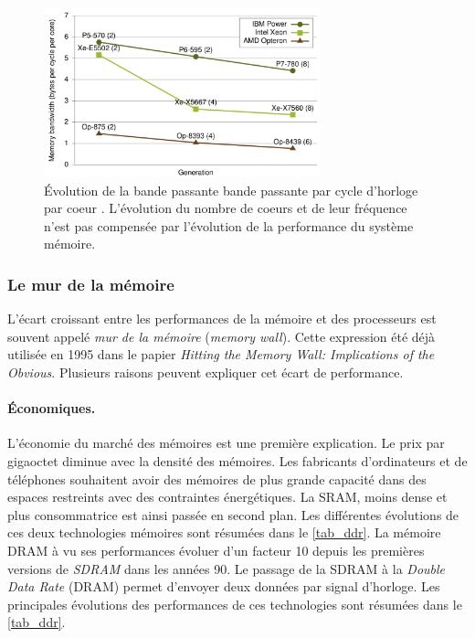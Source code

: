 \begin{figure}
    \center
    \includegraphics[width=8cm]{images/cpu_bw_per_core.png}
    \caption{Évolution de la bande passante bande passante par cycle d'horloge par coeur  \cite{CacheInjection}. L'évolution du nombre de coeurs et de leur fréquence n'est pas compensée par l'évolution de la performance du système mémoire.
    \label{pic_cpu_bw_per_core}}
\end{figure}



\subsubsection{Le mur de la mémoire}
L'écart croissant entre les performances de la mémoire et des processeurs est souvent appelé \textit{mur de la mémoire} (\textit{memory wall}). Cette expression été déjà utilisée en 1995 \cite{Wulf1995} dans le papier \textit{Hitting the Memory Wall: Implications of the Obvious}. Plusieurs raisons peuvent expliquer cet écart de performance.


\paragraph{Économiques.}
L'économie du marché des mémoires est une première explication. Le prix par gigaoctet diminue avec la densité des mémoires. Les fabricants d'ordinateurs et de téléphones souhaitent avoir des mémoires de plus grande capacité dans des espaces restreints avec des contraintes énergétiques. La SRAM, moins dense et plus consommatrice est ainsi passée en second plan. Les différentes évolutions de ces deux technologies mémoires sont résumées dans le \autoref{tab_ddr}.  La mémoire DRAM à vu ses performances évoluer d'un facteur 10 depuis les premières versions de \textit{SDRAM} dans les années 90. Le passage de la SDRAM à la \textit{Double Data Rate} (DRAM) permet d'envoyer deux données par signal d'horloge. Les principales évolutions des performances de ces technologies sont résumées dans le \autoref{tab_ddr}. 

